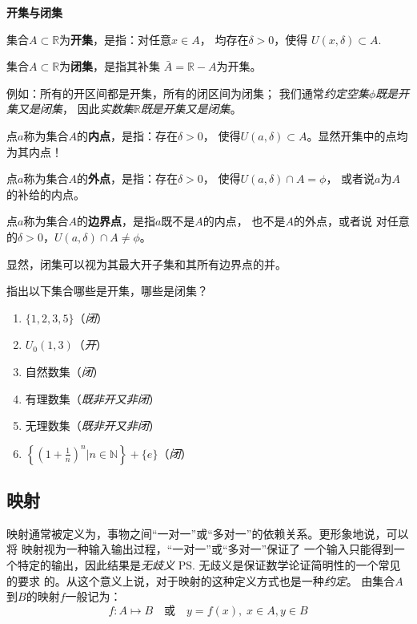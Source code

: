 \begin{shaded}
	{\bf 开集与闭集}
	
	集合$A\subset\mathbb{R}$为{\bf 开集}，是指：对任意$x\in A$，
	均存在$\delta>0$，使得
	$U(x,\delta)\subset A.$
	
	集合$A\subset\mathbb{R}$为{\bf 闭集}，是指其补集
	$\bar{A}=\mathbb{R}-A$为开集。
	
	例如：所有的开区间都是开集，所有的闭区间为闭集；
	我们通常{\it 约定空集$\phi$既是开集又是闭集}，
	因此{\it 实数集$\mathbb{R}$既是开集又是闭集}。
	
	点$a$称为集合$A$的{\bf 内点}，是指：存在$\delta>0$，
	使得$U(a,\delta)\subset A$。显然开集中的点均为其内点！
	
	点$a$称为集合$A$的{\bf 外点}，是指：存在$\delta>0$，
	使得$U(a,\delta)\cap A=\phi$，
	或者说$a$为$A$的补给的内点。
	
	点$a$称为集合$A$的{\bf 边界点}，是指$a$既不是$A$的内点，
	也不是$A$的外点，或者说
	对任意的$\delta>0$，$U(a,\delta)\cap A\ne\phi$。
	
	显然，闭集可以视为其最大开子集和其所有边界点的并。
	
	\egz 指出以下集合哪些是开集，哪些是闭集？
	\begin{enumerate}[(1)]
	  \setlength{\itemindent}{1cm}
	  \item $\{1,2,3,5\}$\hfill（{\it 闭}）
	  \item $U_0(1,3)$\hfill（{\it 开}）
	  \item 自然数集\hfill（{\it 闭}）
	  \item 有理数集\hfill（{\it 既非开又非闭}）
	  \item 无理数集\hfill（{\it 既非开又非闭}）
	  \item $\left\{\left(1+\frac
	  1n\right)^n|n\in\mathbb{N}\right\}+\{e\}$\hfill（{\it 闭}）
	\end{enumerate}
\end{shaded}

\subsection{映射}

映射通常被定义为，事物之间“一对一”或“多对一”的依赖关系。更形象地说，可以将
映射视为一种输入输出过程，“一对一”或“多对一”保证了
一个输入只能得到一个特定的输出，因此结果是{\it 无歧义}
\ps{无歧义是保证数学论证简明性的一个常见的要求}
的。从这个意义上说，对于映射的这种定义方式也是一种{\it 约定}。
由集合$A$到$B$的映射$f$一般记为：
$$f:A\mapsto B \quad\mbox{或}\quad y=f(x),\;x\in A,y\in B$$

